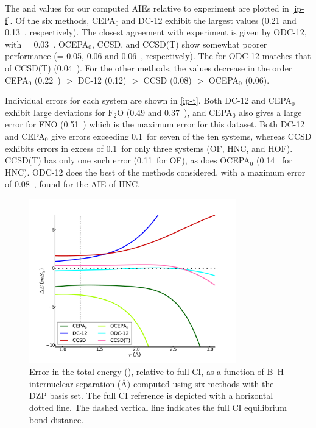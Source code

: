 The \mae and \std values for our computed AIEs relative to experiment are
plotted in \cref{ip-f}.
Of the six methods, CEPA$_0$ and DC-12 exhibit the largest \mae values (0.21 and
0.13~\eV, respectively).
The closest agreement with experiment is given by ODC-12, with \mae = 0.03~\eV.
OCEPA$_0$, CCSD, and CCSD(T) show somewhat poorer performance (\mae = 0.05, 0.06
and 0.06~\eV, respectively). 
The \std for ODC-12 matches that of CCSD(T) (0.04~\eV).
For the other methods, the \std values decrease in the order CEPA$_0$ (0.22~\eV)
$>$ DC-12 (0.12) $>$ CCSD (0.08) $>$ OCEPA$_0$ (0.06).

Individual errors for each system are shown in \cref{ip-t}.
Both DC-12 and CEPA$_0$ exhibit large deviations for $\mathrm{F_2O}$ (0.49 and
0.37~\eV), and CEPA$_0$ also gives a large error for FNO (0.51~\eV) which is the
maximum error for this dataset.
Both DC-12 and CEPA$_0$ give errors exceeding 0.1~\eV for seven of the ten
systems, whereas CCSD exhibits errors in excess of 0.1~\eV for only three
systems (OF, HNC, and HOF).
CCSD(T) has only one such error (0.11~\eV for OF), as does OCEPA$_0$ (0.14~\eV
for HNC).
ODC-12 does the best of the methods considered, with a maximum error of
0.08~\eV, found for the AIE of HNC.


\begin{figure}
	\centering
	\caption{%
        \label{bh-f}
        Error in the total energy (\mhartree), relative to full CI, as a
        function of B--H internuclear separation (\AA) computed using six
        methods with the DZP basis set.
        The full CI reference is depicted with a horizontal dotted line.
        The dashed vertical line indicates the full CI equilibrium bond
        distance.
	}
	\includegraphics[width=0.8\textwidth]{figures/bh.pdf}
\end{figure}

